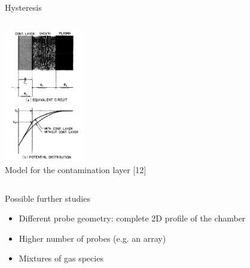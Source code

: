 \documentclass[10pt]{beamer}
\begin{document}
\begin{frame}{Hysteresis}
\begin{columns}[b]
        \begin{center}
            \includegraphics[width=3.5cm]{../figures/contamination_layer.png}\\
            \small Model for the contamination layer [12]
        \end{center}
        
    \end{columns}

\end{frame}


\begin{frame}{Possible further studies}
    \begin{itemize}
        \item Different probe geometry: complete 2D profile of the chamber
        \item Higher number of probes (e.g. an array)
        \item Mixtures of gas species
    \end{itemize}
\end{frame}
\end{document}
